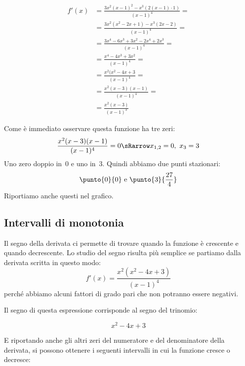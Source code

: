 \begin{align*}
f'(x) &= \frac{3x^2(x-1)^2-x^3(2(x-1)\cdot 1)}{(x-1)^4} =\\
      &= \frac{3x^2(x^2-2x+1)-x^3(2x-2)}{(x-1)^4} =\\
      &= \frac{3x^4-6x^3+3x^2-2x^4+2x^3}{(x-1)^4} =\\
      &= \frac{x^4-4x^3+3x^2}{(x-1)^4} =\\
      &= \frac{x^2(x^2-4x+3}{(x-1)^4} =\\
      &= \frac{x^2(x-3)(x-1)}{(x-1)^4} =\\
      &= \frac{x^2(x-3)}{(x-1)^3}
\end{align*}
\begin{minipage}{.60\linewidth}
Come è immediato osservare questa funzione ha tre zeri:
\[\frac{x^2(x-3)(x-1)}{(x-1)^4}=0 \sRarrow x_{1,2}=0,~x_3=3\]
Uno zero doppio in~0 e uno in~3.
Quindi abbiamo due punti stazionari:
\[\punto{0}{0} \text{ e } \punto{3} {\frac{27}{4}}\]
Riportiamo anche questi nel grafico.
\end{minipage}
\hfill
\begin{minipage}{.38\linewidth}
 \begin{center}
\stazionarifunzionea
 \end{center}
\end{minipage}

\subsection{Intervalli di monotonia}
Il segno della derivata ci permette di trovare quando la funzione è crescente 
e quando decrescente. Lo studio del segno risulta più semplice se partiamo 
dalla derivata scritta in questo modo:
\[f'(x) = \frac{x^2(x^2-4x+3)}{(x-1)^4}\]
perché abbiamo alcuni fattori di grado pari che non potranno essere negativi.

Il segno di questa espressione corrisponde al segno del trinomio:

\begin{minipage}{.49\linewidth}
\[x^2-4x+3\]
\end{minipage}
\hfill
\begin{minipage}{.49\linewidth}
 \begin{center}
\segnotrinomioa
 \end{center}
\end{minipage}

E riportando anche gli altri zeri del numeratore e del denominatore della 
derivata, si possono ottenere i seguenti intervalli in cui la funzione cresce 
o decresce:
\begin{center}
 \segnoderivataa
\end{center}

